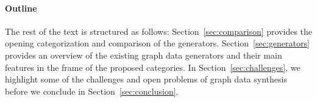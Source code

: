 

\paragraph*{Outline} The rest of the text is structured as follows: Section~\ref{sec:comparison}
provides the opening categorization and comparison of the generators. Section~\ref{sec:generators}
provides an overview of the existing graph data generators and their main features in the frame of
the proposed categories.
In Section~\ref{sec:challenges}, we highlight some of the challenges and open problems of graph
data synthesis before we conclude in Section~\ref{sec:conclusion}.


